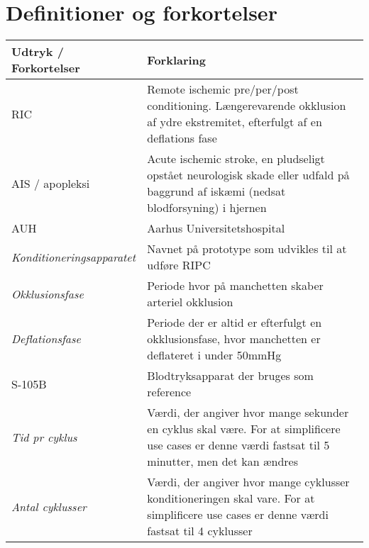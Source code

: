 	\newpage
	\section{Definitioner og forkortelser}
	\begin{longtable}{ |p{} |p{}| } 
		\hline
		\rowcolor{usDef}
		\textbf{Udtryk / Forkortelser} &  \textbf{Forklaring} \\
		\hline
		RIC & Remote ischemic pre/per/post conditioning. Længerevarende okklusion af ydre ekstremitet, efterfulgt af en deflations fase\\
		\hline
		AIS / apopleksi & Acute ischemic stroke, en pludseligt opstået neurologisk skade eller udfald på baggrund af iskæmi (nedsat blodforsyning) i hjernen \\
		\hline
		AUH & Aarhus Universitetshospital \\
		\hline
		\textit{Konditioneringsapparatet} & Navnet på prototype som udvikles til at udføre RIPC \\
		\hline
		\textit{Okklusionsfase} & Periode hvor på manchetten skaber arteriel okklusion \\
		\hline
		\textit{Deflationsfase} & Periode der er altid er efterfulgt en okklusionsfase, hvor manchetten er deflateret i under 50mmHg\\
		\hline
		S-105B & Blodtryksapparat der bruges som reference \\
		\hline
		\textit{Tid pr cyklus} & Værdi, der angiver hvor mange sekunder en cyklus skal være. For at simplificere use cases er denne værdi fastsat til 5 minutter, men det kan ændres \\
		\hline
		\textit{Antal cyklusser} & Værdi, der angiver hvor mange cyklusser konditioneringen skal vare. For at simplificere use cases er denne værdi fastsat til 4 cyklusser \\
		\hline
	\end{longtable}